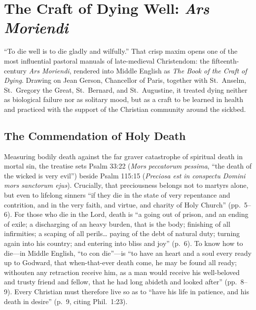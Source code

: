 \section{The Craft of Dying Well: \textit{Ars Moriendi}}

``To die well is to die gladly and wilfully.'' That crisp maxim opens one of the most influential pastoral manuals of late-medieval Christendom: the fifteenth-century \emph{Ars Moriendi}, rendered into Middle English as \emph{The Book of the Craft of Dying}. Drawing on Jean Gerson, Chancellor of Paris, together with St.\ Anselm, St.\ Gregory the Great, St.\ Bernard, and St.\ Augustine, it treated dying neither as biological failure nor as solitary mood, but as a craft to be learned in health and practiced with the support of the Christian community around the sickbed.

\subsection{The Commendation of Holy Death}

Measuring bodily death against the far graver catastrophe of spiritual death in mortal sin, the treatise sets Psalm 33:22 (\emph{Mors peccatorum pessima}, ``the death of the wicked is very evil'') beside Psalm 115:15 (\emph{Preciosa est in conspectu Domini mors sanctorum ejus}). Crucially, that preciousness belongs not to martyrs alone, but even to lifelong sinners ``if they die in the state of very repentance and contrition, and in the very faith, and virtue, and charity of Holy Church'' (pp.\ 5--6). For those who die in the Lord, death is ``a going out of prison, and an ending of exile; a discharging of an heavy burden, that is the body; finishing of all infirmities; a scaping of all perils\ldots{} paying of the debt of natural duty; turning again into his country; and entering into bliss and joy'' (p.\ 6). To know how to die---in Middle English, ``to con die''---is ``to have an heart and a soul every ready up to Godward, that when-that-ever death come, he may be found all ready; withouten any retraction receive him, as a man would receive his well-beloved and trusty friend and fellow, that he had long abideth and looked after'' (pp.\ 8--9). Every Christian must therefore live so as to ``have his life in patience, and his death in desire'' (p.\ 9, citing Phil.\ 1:23).

